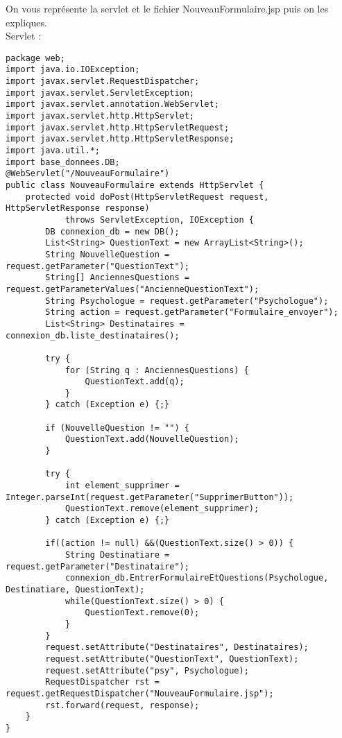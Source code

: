 \documentclass[12]{article}
\begin{document}
On vous représente la servlet et le fichier NouveauFormulaire.jsp puis on les expliques.\\
\newpage
Servlet :

\begin{scriptsize}
\lstset{language=java}
\begin{lstlisting}
package web;
import java.io.IOException;
import javax.servlet.RequestDispatcher;
import javax.servlet.ServletException;
import javax.servlet.annotation.WebServlet;
import javax.servlet.http.HttpServlet;
import javax.servlet.http.HttpServletRequest;
import javax.servlet.http.HttpServletResponse;
import java.util.*;
import base_donnees.DB;
@WebServlet("/NouveauFormulaire")
public class NouveauFormulaire extends HttpServlet {
	protected void doPost(HttpServletRequest request, HttpServletResponse response)
			throws ServletException, IOException {
		DB connexion_db = new DB();
		List<String> QuestionText = new ArrayList<String>();
		String NouvelleQuestion = request.getParameter("QuestionText");
		String[] AnciennesQuestions = request.getParameterValues("AncienneQuestionText");
		String Psychologue = request.getParameter("Psychologue");
		String action = request.getParameter("Formulaire_envoyer");
		List<String> Destinataires = connexion_db.liste_destinataires();
		
		try {
			for (String q : AnciennesQuestions) {
				QuestionText.add(q);
			}
		} catch (Exception e) {;}

		if (NouvelleQuestion != "") {
			QuestionText.add(NouvelleQuestion);
		}

		try {
			int element_supprimer = Integer.parseInt(request.getParameter("SupprimerButton"));
			QuestionText.remove(element_supprimer);
		} catch (Exception e) {;}

		if((action != null) &&(QuestionText.size() > 0)) {
			String Destinatiare = request.getParameter("Destinataire");
			connexion_db.EntrerFormulaireEtQuestions(Psychologue, Destinatiare, QuestionText);
			while(QuestionText.size() > 0) {
				QuestionText.remove(0);
			}
		}
		request.setAttribute("Destinataires", Destinataires);
		request.setAttribute("QuestionText", QuestionText);
		request.setAttribute("psy", Psychologue);
		RequestDispatcher rst = request.getRequestDispatcher("NouveauFormulaire.jsp");
		rst.forward(request, response);
	}
}
\end{lstlisting}
\end{scriptsize}



\newpage
\end{document}
